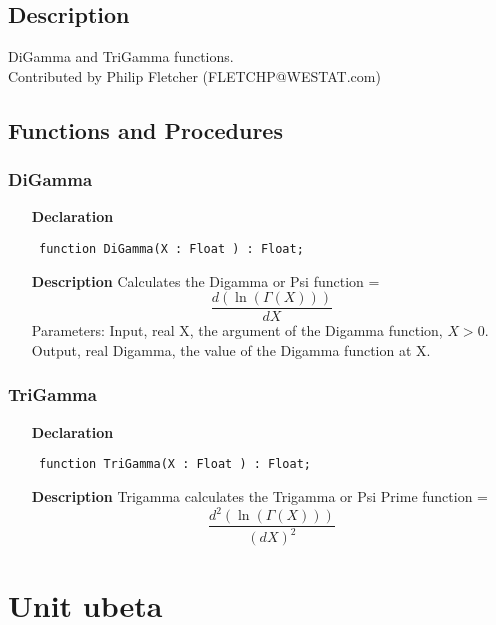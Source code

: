 \documentclass[12pt,a4paper,oneside]{report}
\newcommand{\declarationitem}[1]{\textbf{#1}}
\newcommand{\descriptiontitle}[1]{\textbf{#1}}
\newcommand{\code}[1]{\texttt{#1}}
\begin{document}
\subsection{Description}
DiGamma and TriGamma functions. \\ Contributed by Philip Fletcher (FLETCHP@WESTAT.com) 
\subsection{Functions and Procedures}
\subsubsection{DiGamma}
\label{udigamma-DiGamma}
\begin{itemize}\item[\declarationitem{Declaration}\hfill]
	\begin{flushleft}
		\code{
			function DiGamma(X : Float ) : Float;}
		
	\end{flushleft}
	
	\par
	\item[\descriptiontitle{Description}]
	Calculates the Digamma or Psi function = 
	$$
	\frac{d(\ln(\Gamma(X)))}{dX}
	$$
	Parameters: Input, real X, the argument of the Digamma function, $X>0$. Output, real Digamma, the value of the Digamma function at X.
	
\end{itemize}
\subsubsection{TriGamma}
\label{udigamma-TriGamma}
\begin{itemize}\item[\declarationitem{Declaration}\hfill]
	\begin{flushleft}
		\code{
			function TriGamma(X : Float ) : Float;}
		
	\end{flushleft}
	
	\par
	\item[\descriptiontitle{Description}]
	Trigamma calculates the Trigamma or Psi Prime function =
	$$
	\frac{d^2(\ln(\Gamma(X)))}{(dX)^2}
	$$
\end{itemize}

\section{Unit ubeta}
\label{ubeta}
\end{document}
